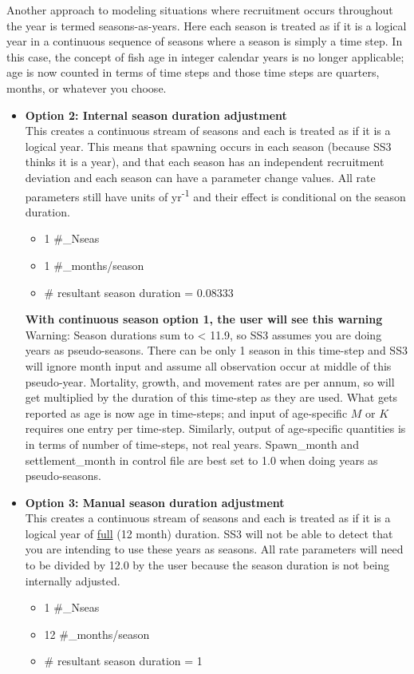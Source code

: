Another approach to modeling situations where recruitment occurs throughout the year is termed seasons-as-years. Here each season is treated as if it is a logical year in a continuous sequence of seasons where a season is simply a time step. In this case, the concept of fish age in integer calendar years is no longer applicable; age is now counted in terms of time steps and those time steps are quarters, months, or whatever you choose.
\begin{itemize}
	\item \textbf{Option 2: Internal season duration adjustment} \hypertarget{option2}{} \\
	 This creates a continuous stream of seasons and each is treated as if it is a logical year. This means that spawning occurs in each season (because SS3 thinks it is a year), and that each season has an independent recruitment deviation and each season can have a parameter change values. All rate parameters still have units of yr\textsuperscript{-1} and their effect is conditional on the season duration.
	 \begin{itemize}
		\item 1 \#\_Nseas
		\item 1 \#\_months/season
		\item \# resultant season duration = 0.08333
	\end{itemize}
	\begin{mybox}{\textbf{With continuous season option 1, the user will see this warning}} \\
		Warning: Season durations sum to < 11.9, so SS3 assumes you are doing years as pseudo-seasons. There can be only 1 season in this time-step and SS3 will ignore month input and assume all observation occur at middle of this pseudo-year. Mortality, growth, and movement rates are per annum, so will get multiplied by the duration of this time-step as they are used. What gets reported as age is now age in time-steps; and input of age-specific $M$ or $K$ requires one entry per time-step. Similarly, output of age-specific quantities is in terms of number of time-steps, not real years. Spawn\_month and settlement\_month in control file are best set to 1.0 when doing years as pseudo-seasons.
	\end{mybox}
	\item \textbf{Option 3: Manual season duration adjustment} \hypertarget{option3}{} \\
	This creates a continuous stream of seasons and each is treated as if it is a logical year of \underline{full} (12 month) duration. SS3 will not be able to detect that you are intending to use these years as seasons. All rate parameters will need to be divided by 12.0 by the user because the season duration is not being internally adjusted.
	\begin{itemize}
		\item 1 \#\_Nseas
		\item 12 \#\_months/season
		\item \# resultant season duration = 1
	\end{itemize}
\end{itemize}

